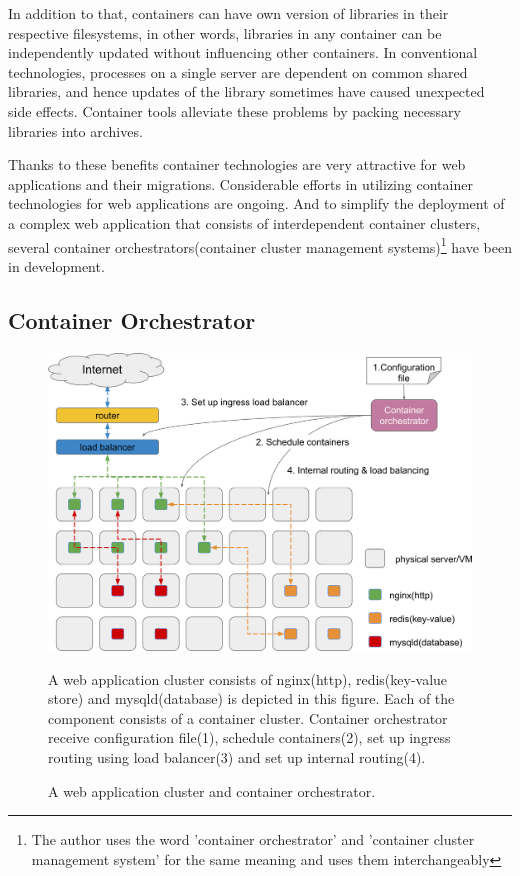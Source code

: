 In addition to that, containers can have own version of libraries in their respective filesystems, in other words, libraries in any container can be independently updated without influencing other containers.
In conventional technologies, processes on a single server are dependent on common shared libraries, and hence updates of the library sometimes have caused unexpected side effects.
Container tools alleviate these problems by packing necessary libraries into archives. 

Thanks to these benefits container technologies are very attractive for web applications and their migrations.
Considerable efforts in utilizing container technologies for web applications are ongoing.
And to simplify the deployment of a complex web application that consists of interdependent container clusters, several container orchestrators(container cluster management systems)\footnote{The author uses the word 'container orchestrator' and 'container cluster management system' for the same meaning and uses them interchangeably} have been in development.

\subsection{Container Orchestrator}

\begin{figure}[h]
\begin{center}
\includegraphics[width=0.9\columnwidth]{Figs/container_management_system}
\end{center}
\caption{
A web application cluster and container orchestrator.
}
\centering\parbox[c]{0.9\columnwidth}{
A web application cluster consists of nginx(http), redis(key-value store) and mysqld(database) is depicted in this figure. 
Each of the component consists of a container cluster.
Container orchestrator receive configuration file(1), schedule containers(2), set up ingress routing using load balancer(3) and set up internal routing(4).
}
\label{fig:container_management_system}
\end{figure}

